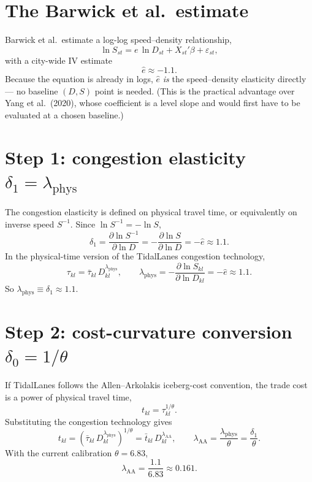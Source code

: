 \documentclass[11pt]{article}
\begin{document}
\section{The Barwick et al.\ estimate}

Barwick et al.\ estimate a log-log speed--density relationship,
\begin{equation}
\ln S_{st}=e\,\ln D_{st}+X_{st}'\beta+\varepsilon_{st},
\end{equation}
with a city-wide IV estimate
\begin{equation}
\hat{e}\approx -1.1.
\end{equation}
Because the equation is already in logs, $\hat{e}$ \emph{is} the speed--density
elasticity directly --- no baseline $(D,S)$ point is needed. (This is the
practical advantage over Yang et al.\ (2020), whose coefficient is a level
slope and would first have to be evaluated at a chosen baseline.)

\section{Step 1: congestion elasticity $\delta_1=\lambda_{\mathrm{phys}}$}

The congestion elasticity is defined on physical travel time, or equivalently
on inverse speed $S^{-1}$. Since $\ln S^{-1}=-\ln S$,
\begin{equation}
\delta_1
=\frac{\partial \ln S^{-1}}{\partial \ln D}
=-\frac{\partial \ln S}{\partial \ln D}
=-\hat{e}\approx 1.1.
\end{equation}
In the physical-time version of the TidalLanes congestion technology,
\begin{equation}
\tau_{kl}=\bar{\tau}_{kl}\,D_{kl}^{\lambda_{\mathrm{phys}}},
\qquad
\lambda_{\mathrm{phys}}=-\frac{\partial \ln S_{kl}}{\partial \ln D_{kl}}
=-\hat{e}\approx 1.1 .
\end{equation}
So $\lambda_{\mathrm{phys}}\equiv\delta_1\approx 1.1$.

\section{Step 2: cost-curvature conversion $\delta_0=1/\theta$}

If TidalLanes follows the Allen--Arkolakis iceberg-cost convention, the trade
cost is a power of physical travel time,
\begin{equation}
t_{kl}=\tau_{kl}^{1/\theta}.
\end{equation}
Substituting the congestion technology gives
\begin{equation}
t_{kl}
=\left(\bar{\tau}_{kl}\,D_{kl}^{\lambda_{\mathrm{phys}}}\right)^{1/\theta}
=\bar{t}_{kl}\,D_{kl}^{\lambda_{\mathrm{AA}}},
\qquad
\lambda_{\mathrm{AA}}=\frac{\lambda_{\mathrm{phys}}}{\theta}=\frac{\delta_1}{\theta}.
\end{equation}
With the current calibration $\theta=6.83$,
\begin{equation}
\lambda_{\mathrm{AA}}=\frac{1.1}{6.83}\approx 0.161 .
\end{equation}
\end{document}
